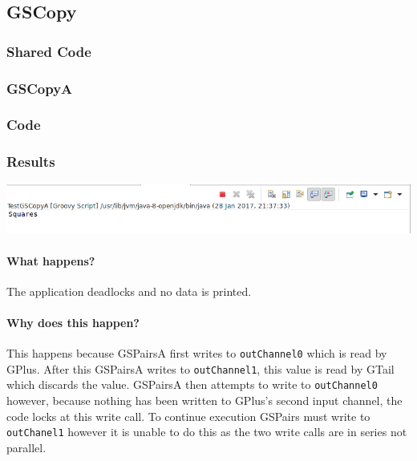 \subsection{GSCopy}

\subsubsection*{Shared Code}


\subsubsection{GSCopyA}

\subsubsection*{Code}


\subsubsection*{Results}

\includegraphics[width=\textwidth]{img/screenshots/3-2-1.png}

\paragraph{What happens?}

The application deadlocks and no data is printed.

\paragraph{Why does this happen?}

This happens because GSPairsA first writes to \texttt{outChannel0} which is read by GPlus.  After this GSPairsA writes to \texttt{outChannel1}, this value is read by GTail which discards the value.  GSPairsA then attempts to write to \texttt{outChannel0} however, because nothing has been written to GPlus's second input channel, the code locks at this write call.  To continue execution GSPairs must write to \texttt{outChanel1} however it is unable to do this as the two write calls are in series not parallel.


